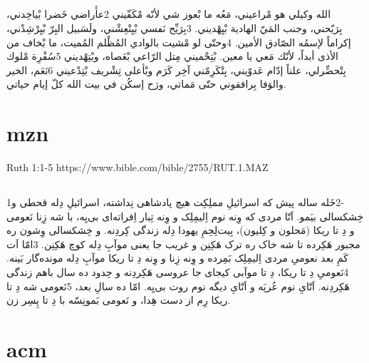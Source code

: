 \documentclass[12pt,fleqn,titlepage,twoside,a4paper]{book}
\begin{document}
\begin{arab}[utf]
\section*{}

الله وكيلي هو مْراعيني،
مَعُه ما بْعوز شي لأنّه مْكَفّيني
2عأَراضي خَضرا بْياخِدني، بِرَيّحني،
وجنب المَيّ الهادية بْيِهْديني.
3بِرَيِّح نَفسي بْيِنْعِشْني،
ولَسَبيل البِرّ بْيِرْشِدْني،
إكراماً لإسمُه الصّادق الأمين.
4وحتّى لو مْشيت بالوادي المُظْلم المُميت،
ما بْخاف من الأذى أبداً، لأنّك مَعي يا معين.
بْتِحْميني مِتل الرّاعي بْعَصاه، وبْتِهْديني
5سُفْرِة مْلوك بِتْحضِّرلي، علناً إدّام عَدوّيني،
بِتْكَرِمّني آخِر كَرَم وبْأعلى تِشْريف بْتِدْعيني
6نَعَم، الخير والوَفا بِرافقوني حتّى مَماتي،
ورَح إسكُن في بيت الله كلّ إيام حياتي.

\end{arab}


\section{mzn}

Ruth 1:1-5  https://www.bible.com/bible/2755/RUT.1.MAZ

\begin{arab}[utf]
\section*{}

1‏-2خَله ساله پیش که اسرائیلِ مملِکِت هیچ پادشاهی نِداشته، اسرائیلِ دِله قحطی و خِشکسالی بیَمو. اَتّا مردی که وِنه نوم اِلیمِلِک و وِنه تِبار اِفراته‌ای بی‌یِه، با شه زِنا نَعومی و دِ تا ریکا (مَحلون و کِلیون)، بِیت‌لِحِمِ یهودا دِله زندگی کِردِنه. و خِشکسالی وِشون ره مجبور هَکِرده تا شه خاک ره ترک هَکِنِن و غریب جا یعنی موآبِ دِله کوچ هَکِنِن. 3امّا اَت کَمِ بعد نعومیِ مردی اِلیمِلِک بَمِرده و وِنه زِنا و وِنه دِ تا ریکا موآبِ دِله مونده‌گار بَینه. 4نَعومیِ دِ تا ریکا، دِ تا موآبی کیجای جا عروسی هَکِردِنه و حِدود ده سال باهم زندگی هَکِردِنه. اَتّایِ نوم عُرپَه و اَتّایِ دیگه نوم روت بی‌یِه. امّا ده سالِ بعد، 5نَعومی شه دِ تا ریکا رِم از دست هِدا، و نَعومی بَمونِسّه با دِ تا پِسِر زن.

\end{arab}


\section{acm}
\end{document}
